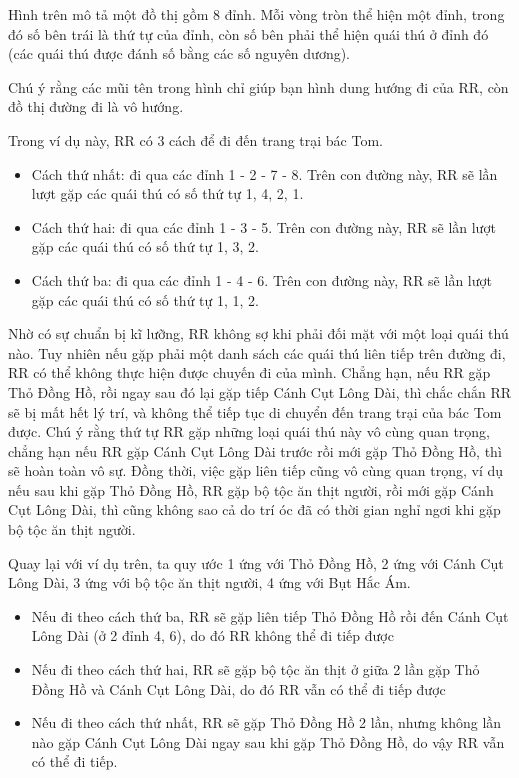 Hình trên mô tả một đồ thị gồm 8 đỉnh. Mỗi vòng tròn thể hiện một đỉnh, trong đó số bên trái là thứ tự của đỉnh, còn số bên phải thể hiện quái thú ở đỉnh đó (các quái thú được đánh số bằng các số nguyên dương).

Chú ý rằng các mũi tên trong hình chỉ giúp bạn hình dung hướng đi của RR, còn đồ thị đường đi là vô hướng.

Trong ví dụ này, RR có 3 cách để đi đến trang trại bác Tom.
\begin{itemize}
	\item Cách thứ nhất: đi qua các đỉnh 1 - 2 - 7 - 8. Trên con đường này, RR sẽ lần lượt gặp các quái thú có số thứ tự 1, 4, 2, 1.
	\item Cách thứ hai: đi qua các đỉnh 1 - 3 - 5. Trên con đường này, RR sẽ lần lượt gặp các quái thú có số thứ tự 1, 3, 2.
	\item Cách thứ ba: đi qua các đỉnh 1 - 4 - 6. Trên con đường này, RR sẽ lần lượt gặp các quái thú có số thứ tự 1, 1, 2.
\end{itemize}

Nhờ có sự chuẩn bị kĩ lưỡng, RR không sợ khi phải đối mặt với một loại quái thú nào. Tuy nhiên nếu gặp phải một danh sách các quái thú liên tiếp trên đường đi, RR có thể không thực hiện được chuyến đi của mình. Chẳng hạn, nếu RR gặp Thỏ Đồng Hồ, rồi ngay sau đó lại gặp tiếp Cánh Cụt Lông Dài, thì chắc chắn RR sẽ bị mất hết lý trí, và không thể tiếp tục di chuyển đến trang trại của bác Tom được. Chú ý rằng thứ tự RR gặp những loại quái thú này vô cùng quan trọng, chẳng hạn nếu RR gặp Cánh Cụt Lông Dài trước rồi mới gặp Thỏ Đồng Hồ, thì sẽ hoàn toàn vô sự. Đồng thời, việc gặp liên tiếp cũng vô cùng quan trọng, ví dụ nếu sau khi gặp Thỏ Đồng Hồ, RR gặp bộ tộc ăn thịt người, rồi mới gặp Cánh Cụt Lông Dài, thì cũng không sao cả do trí óc đã có thời gian nghỉ ngơi khi gặp bộ tộc ăn thịt người.

Quay lại với ví dụ trên, ta quy ước 1 ứng với Thỏ Đồng Hồ, 2 ứng với Cánh Cụt Lông Dài, 3 ứng với bộ tộc ăn thịt người, 4 ứng với Bụt Hắc Ám.
\begin{itemize}
	\item Nếu đi theo cách thứ ba, RR sẽ gặp liên tiếp Thỏ Đồng Hồ rồi đến Cánh Cụt Lông Dài (ở 2 đỉnh 4, 6), do đó RR không thể đi tiếp được
	\item Nếu đi theo cách thứ hai, RR sẽ gặp bộ tộc ăn thịt ở giữa 2 lần gặp Thỏ Đồng Hồ và Cánh Cụt Lông Dài, do đó RR vẫn có thể đi tiếp được
	\item Nếu đi theo cách thứ nhất, RR sẽ gặp Thỏ Đồng Hồ 2 lần, nhưng không lần nào gặp Cánh Cụt Lông Dài ngay sau khi gặp Thỏ Đồng Hồ, do vậy RR vẫn có thể đi tiếp.
\end{itemize}

